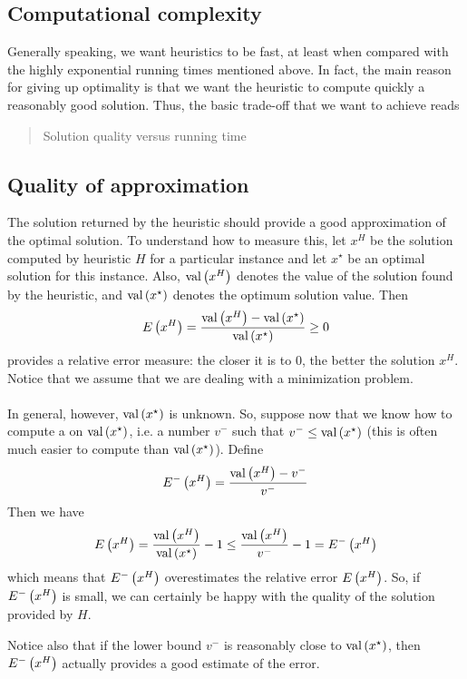 \subsection{Computational complexity}
Generally speaking, we want heuristics to be fast, at least when compared with the highly exponential running times mentioned above. In fact, the main reason for giving up optimality is that we want the heuristic to compute quickly a reasonably good solution. Thus, the basic trade-off that we want to achieve reads
\begin{quote}
Solution quality versus running time
\end{quote}

\subsection{Quality of approximation}
The solution returned by the heuristic should provide a good approximation of the optimal solution. To understand how to measure this, let $x^H$ be the solution computed by heuristic $H$ for a particular instance and let $x^{\star}$ be an optimal solution for this instance. Also, $\mbox{val}\left( x^H \right)$ denotes the value of the solution found by the heuristic, and $\mbox{val}\left( x^{\star} \right)$ denotes the optimum solution value. Then
\begin{equation}
E\left( x^H \right)=\displaystyle\frac{\mbox{val}\left( x^H \right)-\mbox{val}\left( x^{\star} \right)}{\mbox{val}\left( x^{\star} \right)}\geq 0
\end{equation}
provides a relative error measure: the closer it is to $0$, the better the solution $x^H$. Notice that we assume that we are dealing with a minimization problem.

\paragraph{}
In general, however, $\mbox{val}\left( x^{\star} \right)$ is unknown. So, suppose now that we know how to compute a  on $\mbox{val}\left( x^{\star} \right)$, i.e. a number $v^-$ such that $v^-\leq\mbox{val}\left( x^{\star} \right)$ (this is often much easier to compute than $\mbox{val}\left( x^{\star} \right)$). Define
\begin{equation}
E^-\left( x^H \right)=\displaystyle\frac{\mbox{val}\left( x^H \right)-v^-}{v^-}
\end{equation}
Then we have
\begin{equation}
E\left( x^H \right)=\displaystyle\frac{\mbox{val}\left( x^H \right)}{\mbox{val}\left( x^{\star} \right)}-1\leq\displaystyle\frac{\mbox{val}\left( x^H \right)}{v^-}-1=E^-\left( x^H \right)
\end{equation}
which means that $E^-\left( x^H \right)$ overestimates the relative error $E\left( x^H \right)$. So, if $E^-\left( x^H \right)$ is small, we can certainly be happy with the quality of the solution provided by $H$.
\begin{note}
Notice also that if the lower bound $v^-$ is reasonably close to $\mbox{val}\left( x^{\star} \right)$, then $E^-\left( x^H \right)$ actually provides a good estimate of the error.
\end{note}

